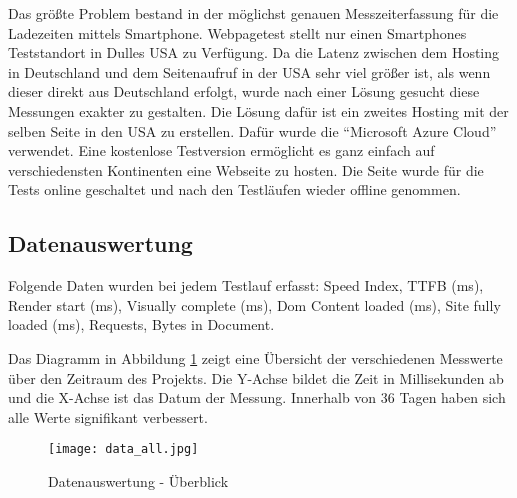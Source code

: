 		Das größte Problem bestand in der möglichst genauen Messzeiterfassung für die Ladezeiten mittels Smartphone. Webpagetest stellt nur einen Smartphones Teststandort in Dulles USA zu Verfügung. Da die Latenz zwischen dem Hosting in Deutschland und dem Seitenaufruf in der USA sehr viel größer ist, als wenn dieser direkt aus Deutschland erfolgt, wurde nach einer Lösung gesucht diese Messungen exakter zu gestalten.
		Die Lösung dafür ist ein zweites Hosting mit der selben Seite in den USA zu erstellen. Dafür wurde die "`Microsoft Azure Cloud"' verwendet. Eine kostenlose Testversion ermöglicht es ganz einfach auf verschiedensten Kontinenten eine Webseite zu hosten. Die Seite wurde für die Tests online geschaltet und nach den Testläufen wieder offline genommen.

	\pagebreak

	\subsection{Datenauswertung}
	\label{sub:datenauswertung}
		Folgende Daten wurden bei jedem Testlauf erfasst: Speed Index, TTFB (ms), Render start (ms), Visually complete (ms), Dom Content loaded (ms), Site fully loaded (ms), Requests, Bytes in Document.

    Das Diagramm in Abbildung \ref{fig:data_all} zeigt eine Übersicht der verschiedenen Messwerte über den Zeitraum des Projekts. Die Y-Achse bildet die Zeit in Millisekunden ab und die X-Achse ist das Datum der Messung. Innerhalb von 36 Tagen haben sich alle Werte signifikant verbessert.

    \begin{figure}[htbp]
    	\begin{center}
    		\texttt{[image: data\_all.jpg]}
    		\caption{Datenauswertung - Überblick}
    		\label{fig:data_all}
    	\end{center}
    \end{figure}

